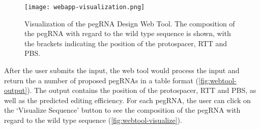 \begin{figure}
    \centering
    \texttt{[image: webapp-visualization.png]}
    \caption[pegRNA Design Web Tool Visualization]{Visualization of the pegRNA Design Web Tool. The composition of the pegRNA with regard to the wild type sequence is shown, with the brackets indicating the position of the protospacer, RTT and PBS.}
    \label{fig:webtool-visualize}
\end{figure}


After the user submits the input, the web tool would process the input and return the a number of proposed pegRNAs in a table format (\autoref{fig:webtool-output}). The output contains the position of the protospacer, RTT and PBS, as well as the predicted editing efficiency. For each pegRNA, the user can click on the `Visualize Sequence' button to see the composition of the pegRNA with regard to the wild type sequence (\autoref{fig:webtool-visualize}).